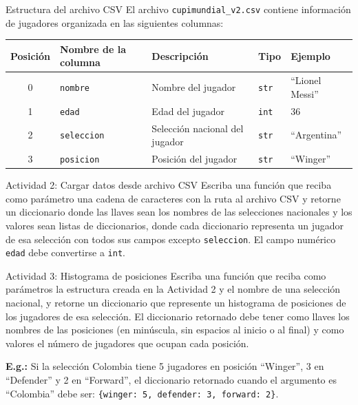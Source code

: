 \documentclass{ip-lab}
\begin{document}
\begin{sectionbox}{Estructura del archivo CSV}
  El archivo \texttt{cupimundial\_v2.csv} contiene información de jugadores organizada en las siguientes columnas:

  \begin{table}[H]
  \centering
  \begin{tabular}{|c|l|p{5cm}|l|l|}
  \hline
  \textbf{Posición} & \textbf{Nombre de la columna} & \textbf{Descripción} & \textbf{Tipo} & \textbf{Ejemplo} \\
  \hline
  0 & \texttt{nombre} & Nombre del jugador & \texttt{str} & ``Lionel Messi'' \\
  \hline
  1 & \texttt{edad} & Edad del jugador & \texttt{int} & 36 \\
  \hline
  2 & \texttt{seleccion} & Selección nacional del jugador & \texttt{str} & ``Argentina'' \\
  \hline
  3 & \texttt{posicion} & Posición del jugador & \texttt{str} & ``Winger'' \\
  \hline
  \end{tabular}
  \end{table}
\end{sectionbox}

\begin{sectionbox}{Actividad 2: Cargar datos desde archivo CSV}
  Escriba una función que reciba como parámetro una cadena de caracteres con la ruta al archivo CSV y retorne un diccionario donde las llaves sean los nombres de las selecciones nacionales y los valores sean listas de diccionarios, donde cada diccionario representa un jugador de esa selección con todos sus campos excepto \texttt{seleccion}. El campo numérico \texttt{edad} debe convertirse a \texttt{int}.
\end{sectionbox}

\pagebreak

\begin{sectionbox}{Actividad 3: Histograma de posiciones}
  Escriba una función que reciba como parámetros la estructura creada en la Actividad 2 y el nombre de una selección nacional, y retorne un diccionario que represente un histograma de posiciones de los jugadores de esa selección. El diccionario retornado debe tener como llaves los nombres de las posiciones (en minúscula, sin espacios al inicio o al final) y como valores el número de jugadores que ocupan cada posición.

  \textbf{E.g.:} Si la selección Colombia tiene 5 jugadores en posición ``Winger'', 3 en ``Defender'' y 2 en ``Forward'', el diccionario retornado cuando el argumento es ``Colombia'' debe ser: \texttt{\{\textquotedbl winger\textquotedbl: 5, \textquotedbl defender\textquotedbl: 3, \textquotedbl forward\textquotedbl: 2\}}.
\end{sectionbox}
\end{document}
